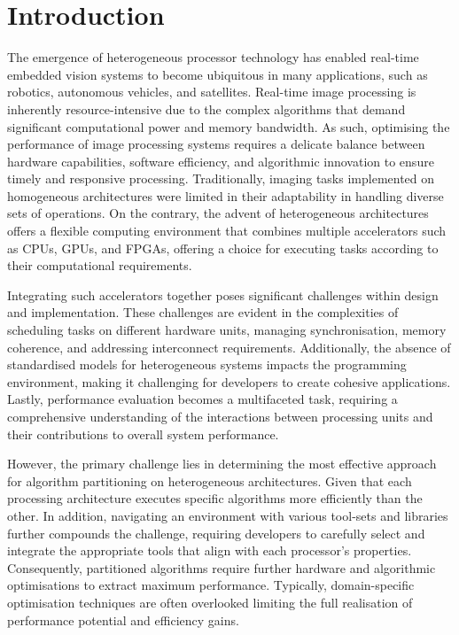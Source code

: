 \chapter{Introduction}
\label{chap:intro}
The emergence of heterogeneous processor technology has enabled real-time embedded vision systems to become ubiquitous in many applications, such as robotics\cite{ZhaMenPra23}, autonomous vehicles\cite{KaiHonAma18}, and satellites\cite{PapTzioKal22}. Real-time image processing is inherently resource-intensive due to the complex algorithms that demand significant computational power and memory bandwidth. As such, optimising the performance of image processing systems requires a delicate balance between hardware capabilities, software efficiency, and algorithmic innovation to ensure timely and responsive processing. Traditionally, imaging tasks implemented on homogeneous architectures were limited in their adaptability in handling diverse sets of operations. On the contrary, the advent of heterogeneous architectures offers a flexible computing environment that combines  multiple accelerators such as CPUs, GPUs, and FPGAs, offering a choice for executing tasks according to their computational requirements.

Integrating such accelerators together poses significant challenges within design and implementation. These challenges are evident in the complexities of scheduling tasks on different hardware units, managing synchronisation, memory coherence, and addressing interconnect requirements. Additionally, the absence of standardised models for heterogeneous systems impacts the programming environment, making it challenging for developers to create cohesive applications. Lastly, performance evaluation becomes a multifaceted task, requiring a comprehensive understanding of the interactions between processing units and their contributions to overall system performance.

However, the primary challenge lies in determining the most effective approach for algorithm partitioning on heterogeneous architectures. Given that each processing architecture executes specific algorithms more efficiently than the other\cite{7577314,QasDenVis19}. In addition, navigating an environment with various tool-sets and libraries further compounds the challenge, requiring developers to carefully select and integrate the appropriate tools that align with each processor's properties. Consequently, partitioned algorithms require further hardware and algorithmic optimisations to extract maximum performance. Typically, domain-specific optimisation techniques are often overlooked limiting the full realisation of performance potential and efficiency gains.

